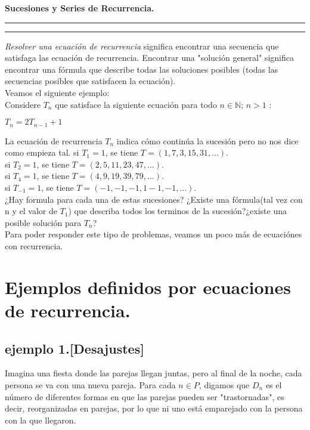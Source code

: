 \documentclass[11pt,a4paper]{article}
\begin{document}
\pagestyle{empty}
\begin{minipage}[c]{10cm}
\end{minipage}
\begin{center}
\textbf{Sucesiones y Series de Recurrencia.}
\end{center}
\vspace*{-0.1cm}
\hrule
\vspace*{0.1cm}
\rule{17cm}{1mm}
\vspace{0.2cm}

\textit{Resolver una ecuación de recurrencia} significa encontrar una secuencia que satisfaga las ecuación de recurrencia. Encontrar una "solución general" significa encontrar una fórmula que describe todas las soluciones posibles (todas las secuencias posibles que satisfacen la ecuación).\\
Veamos el siguiente ejemplo:\\
Considere $T_{n}$ que satisface la siguiente ecuación para todo $n \in \mathbb{N}$; $n>1$ : 
\begin{center}
$T_{n} = 2T_{n-1} + 1 $ 
\end{center}

La ecuación de recurrencia $T_{n}$ indica cómo continúa la sucesión pero no nos dice como empieza tal.
\newline
si $T_{1} = 1$,\hspace*{1cm} se tiene $T = (1,7,3,15,31,...)$.\\
si $T_{2} = 1$,\hspace*{1cm} se tiene $T = (2,5,11,23,47,...)$.\\
si $T_{4} = 1$,\hspace*{1cm} se tiene $T = (4,9,19,39,79,...)$.\\
si $T_{-1}= 1$,\hspace*{1cm} se tiene $T = (-1,-1,-1,1-1,-1,...)$.\\

¿Hay formula para cada una de estas sucesiones? ¿Existe una fórmula(tal vez con n y el valor de $T_{1}$) que describa todos los terminos de la sucesión?¿existe una posible solución para $T_{n}$?\\Para poder responder este tipo de problemas, veamos un poco más de ecuaciónes con recurrencia.

\section{Ejemplos definidos por ecuaciones de recurrencia.}
\subsection{ejemplo 1.[Desajustes]}
Imagina una fiesta donde las parejas llegan juntas, pero al final de la noche, cada persona se va con una nueva pareja. Para cada $n \in P$, digamos que $D_{n}$ es el número de diferentes formas en que las parejas pueden ser "trastornadas", es decir, reorganizadas en parejas, por lo que ni uno está emparejado con la persona con la que llegaron.\\
\end{document}
